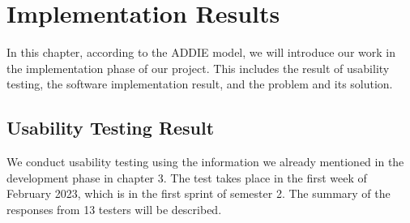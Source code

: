 \documentclass[12pt,oneside,openright,a4paper]{cpe-english-project}
\begin{document}
\chapter{Implementation Results}
In this chapter, according to the ADDIE model, we will introduce our work in the implementation phase of our project. This includes the result of usability testing, the software implementation result, and the problem and its solution.


\section{Usability Testing Result}
We conduct usability testing using the information we already mentioned in the development phase in chapter 3. The test takes place in the first week of February 2023, which is in the first sprint of semester 2. The summary of the responses from 13 testers will be described.
\end{document}
